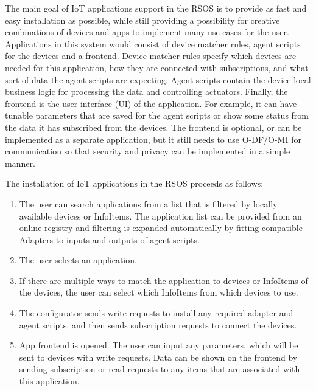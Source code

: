 The main goal of IoT applications support in the RSOS is to provide as fast and easy installation as possible, while still providing a possibility for creative combinations of devices and apps to implement many use cases for the user. Applications in this system would consist of device matcher rules, agent scripts for the devices and a frontend. Device matcher rules specify which devices are needed for this application, how they are connected with subscriptions, and what sort of data the agent scripts are expecting. Agent scripts contain the device local business logic for processing the data and controlling actuators. Finally, the frontend is the user interface (UI) of the application. For example, it can have tunable parameters that are saved for the agent scripts or show some status from the data it has subscribed from the devices. The frontend is optional, or can be implemented as a separate application, but it still needs to use O-DF/O-MI for communication so that security and privacy can be implemented in a simple manner.

The installation of IoT applications in the RSOS proceeds as follows:
\begin{enumerate}
  \item The user can search applications from a list that is filtered by locally available devices or InfoItems. The application list can be provided from an online registry and filtering is expanded automatically by fitting compatible Adapters to inputs and outputs of agent scripts.
  \item The user selects an application.
  \item If there are multiple ways to match the application to devices or InfoItems of the devices, the user can select which InfoItems from which devices to use.
  \item The configurator sends write requests to install any required adapter and agent scripts, and then sends subscription requests to connect the devices.
  \item App frontend is opened. The user can input any parameters, which will be sent to devices with write requests. Data can be shown on the frontend by sending subscription or read requests to any items that are associated with this application.
\end{enumerate}

